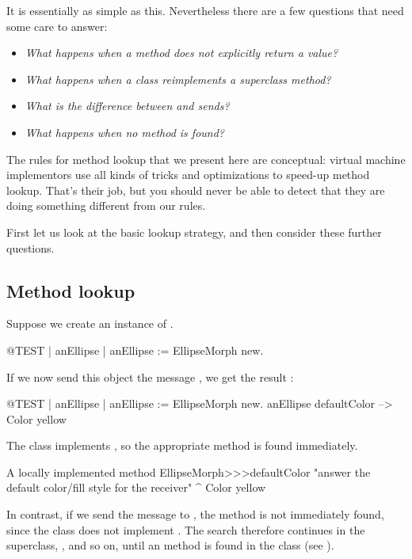 \documentclass[a4paper,10pt,twoside]{book}
\begin{document}
It is essentially as simple as this.
Nevertheless there are a few questions that need some care to answer:

\begin{itemize}
  \item \emph{What happens when a method does not explicitly return a value?}
  \item \emph{What happens when a class reimplements a superclass method?}
  \item \emph{What is the difference between  and  sends?}
  \item \emph{What happens when no method is found?}
\end{itemize}

The rules for method lookup that we present here are conceptual: virtual machine implementors use all kinds of tricks and optimizations to speed-up method lookup. 
That's their job, but you should never be able to detect that they are doing something different from our rules.

First let us look at the basic lookup strategy, and then consider these further questions.

\subsection{Method lookup}
Suppose we create an instance of .
\begin{code}{@TEST | anEllipse |}
anEllipse := EllipseMorph new.
\end{code}
\noindent
If we now send this object the message , we get the result :
\begin{code}{@TEST | anEllipse | anEllipse := EllipseMorph new.}
anEllipse defaultColor --> Color yellow
\end{code}
\noindent
The class  implements , so the appropriate method is found immediately.

\begin{method}[defaultColor]{A locally implemented method}
EllipseMorph>>>defaultColor
	"answer the default color/fill style for the receiver"
	^ Color yellow
\end{method}

In contrast, if we send the message  to , the method is not immediately found, since the class  does not implement .
The search therefore continues in the superclass, , and so on, until an  method is found in the class  (see ).
\end{document}
